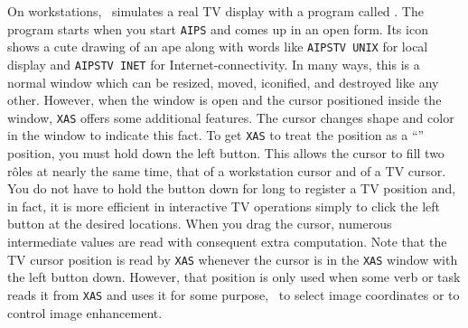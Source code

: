 
     On workstations, \AIPS\ simulates a real TV display with a
program called {\tt {}}\@.  The program starts when you start
{\tt AIPS} and comes up in an open form.  Its icon shows a cute
drawing of an ape along with words like {\tt AIPSTV UNIX} for local
display and {\tt AIPSTV INET} for Internet-connectivity.  In many
ways, this is a normal window which can be resized, moved, iconified,
and destroyed like any other.  However, when the window is open and
the cursor positioned inside the window, {\tt XAS} offers some
additional features.  The cursor changes shape and color in the window
to indicate this fact.  To get {\tt XAS} to treat the 
position as a ``'' position, you must hold down the
left  button.  This allows the cursor to fill two r\^oles
at nearly the same time, that of a workstation cursor and of a TV
cursor.  You do not have to hold the button down for long to register
a TV position and, in fact, it is more efficient in interactive TV
operations simply to click the left button at the desired locations.
When you drag the cursor, numerous intermediate values are read with
consequent extra computation.  Note that the TV cursor position is
read by {\tt XAS} whenever the cursor is in the {\tt XAS} window with
the left button down.  However, that position is only used when some
verb or task reads it from {\tt XAS} and uses it for some purpose,
\eg\ to select image coordinates or to control image enhancement.


